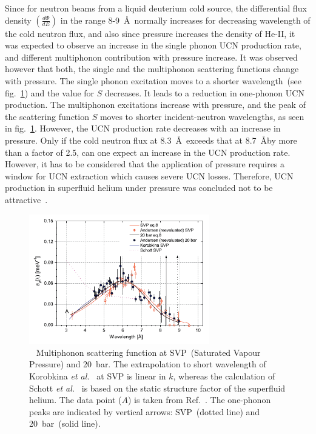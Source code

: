 Since for neutron beams from a liquid deuterium cold source, the
differential flux density $\left( \frac{d\Phi}{dE} \right)$ in the
range 8-9~\AA~normally increases for decreasing wavelength of the cold
neutron flux, and also since pressure increases the density of He-II,
it was expected to observe an increase in the single phonon UCN
production rate, and different multiphonon contribution with pressure
increase.  It was observed however that both, the single and the
multiphonon scattering functions change with pressure. The single
phonon excitation moves to a shorter wavelength~(see
fig.~\ref{fig:Schmidt_S}) and the value for $S$ decreases. It leads to
a reduction in one-phonon UCN production. The multiphonon excitations
increase with pressure, and the peak of the scattering function $S$
moves to shorter incident-neutron wavelengths, as seen in
fig.~\ref{fig:Schmidt_S}. However, the UCN production rate decreases
with an increase in pressure.  Only if the cold neutron flux at
8.3~\AA~exceeds that at 8.7~\AA by more than a factor of 2.5, can one
expect an increase in the UCN production rate.
However, it has to be considered that the application of pressure
requires a window for UCN extraction which causes severe UCN
losses. Therefore, UCN production in superfluid helium under pressure
was concluded not to be attractive~\cite{Schmidt2009}.




\begin{figure}[h!]
\begin{center}
   \includegraphics[width=0.7\textwidth]{Schmidt_S.PNG}
   \caption[Multiphonon scattering function of superfluid helium at
   differnet pressures]{~\cite{Schmidt2009} Multiphonon scattering
     function at SVP~(Saturated Vapour Pressure) and 20~bar. The
     extrapolation to short wavelength of Korobkina {\it {et
         al.}}~\cite{Korobkina2002} at SVP is linear in $k$, whereas
     the calculation of Schott {\it {et al.}}~\cite{Schott2003} is
     based on the static structure factor of the superfluid
     helium. The data point ($A$) is taken from
     Ref.~\cite{Fak1991}. The one-phonon peaks are indicated by
     vertical arrows: SVP~(dotted line) and 20~bar~(solid line).  }
    \label{fig:Schmidt_S}
    \end{center}
\end{figure} 



